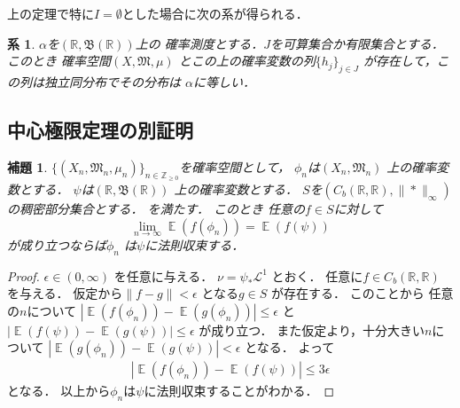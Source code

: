 \documentclass[leqno, 12pt]{jsarticle}
\newtheorem{cor}[thm]{系}
\newtheorem{lem}[thm]{補題}
\newcommand{\zz}{\mathbb{Z}}
\newcommand{\rr}{\mathbb{R}}
\DeclareMathOperator{\mean}{\mathbb{E}}
\begin{document}
上の定理で特に$I=\emptyset$とした場合に次の系が得られる．
\begin{cor}
$\alpha$を$(\rr, \mathfrak{B}(\rr))$上の
確率測度とする．$J$を可算集合か有限集合とする．
このとき
確率空間$(X, \mathfrak{M}, \mu)$
とこの上の確率変数の列$\{h_{j}\}_{j\in J}$
が存在して，この列は独立同分布でその分布は
$\alpha$に等しい．
\end{cor}

\subsection{中心極限定理の別証明}
\begin{lem}
$\{(X_{n}, \mathfrak{M}_{n}, \mu_{n})\}_{n\in \zz_{\ge 0}}$を確率空間として，
$\phi_{n}$は$(X_{n}, \mathfrak{M}_{n})$
上の確率変数とする．
$\psi$は$(\rr, \mathfrak{B}(\rr))$
上の確率変数とする．
$S$を$(C_{b}(\rr, \rr), \|*\|_{\infty})$の稠密部分集合とする．
を満たす．
このとき
任意の$f\in S$に対して
\[
\lim_{n\to \infty}\mean(f(\phi_{n}))
=
\mean(f(\psi))
\]
が成り立つならば$\phi_{n}$
は$\psi$に法則収束する．
\end{lem}
\begin{proof}
$\epsilon\in (0, \infty)$
を任意に与える．
$\nu=\psi_{*}\mathcal{L}^1$
とおく．
任意に$f\in C_{b}(\rr, \rr)$
を与える．
仮定から$\|f-g\|<\epsilon$
となる$g\in S$
が存在する．
このことから
任意の$n$について
$|\mean(f(\phi_{n}))-\mean(g(\phi_{n}))|\le \epsilon$
と
$|\mean(f(\psi))-\mean(g(\psi))|\le \epsilon$
が成り立つ．
また仮定より，十分大きい$n$について
$|\mean(g(\phi_{n}))-\mean(g(\psi))|<\epsilon$
となる．
よって
\begin{align*}
|\mean(f(\phi_{n}))-\mean(f(\psi))|\le 3\epsilon
\end{align*}
となる．
以上から$\phi_{n}$は$\psi$に法則収束することがわかる．
\end{proof}
\end{document}
